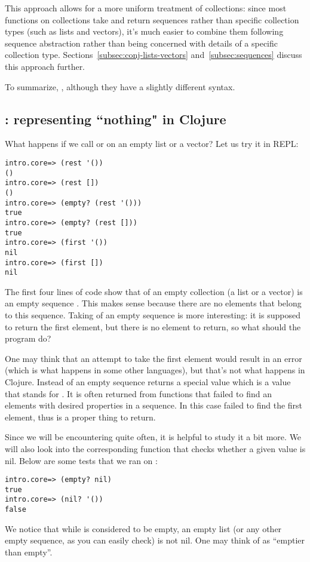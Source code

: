 This approach allows for a more uniform treatment of collections: since most functions on collections take and return sequences rather than specific collection types (such as lists and vectors), it's much easier to combine them following sequence abstraction rather than being concerned with details of a specific collection type. Sections~\ref{subsec:conj-lists-vectors} and~\ref{subsec:sequences} discuss this approach further. 

To summarize, , although they have a slightly different syntax.  


\subsection{: representing ``nothing" in Clojure}\label{subsec:nil}
What happens if we call  or  on an empty list or a vector?  Let us try it in REPL:
\begin{framed}
\begin{verbatim}
intro.core=> (rest '())
()
intro.core=> (rest [])
()
intro.core=> (empty? (rest '()))
true
intro.core=> (empty? (rest []))
true
intro.core=> (first '())
nil
intro.core=> (first [])
nil
\end{verbatim}
\end{framed}
The first four lines of code show that  of an empty collection (a list or a vector) is an empty sequence \clocode{()}. This makes sense because there are no elements that belong to this sequence. Taking  of an empty sequence is more interesting: it is supposed to return the first element, but there is no element to return, so what should the program do? 

One may think that an attempt to take the first element would result in an error (which is what happens in some other languages), but that's not what happens in Clojure. Instead  of an empty sequence returns a special value  which is a value that stands for . It is often returned from functions that failed to find an elements with desired properties in a sequence. In this case  failed to find the first element, thus  is a proper thing to return. 

Since we will be encountering  quite often, it is helpful to study it a bit more. We will also look into the corresponding function  that checks whether a given value is nil. Below are some tests that we ran on  :
\begin{framed}
\begin{verbatim}
intro.core=> (empty? nil)
true
intro.core=> (nil? '())
false
\end{verbatim}
\end{framed}
We notice that while  is considered to be empty, an empty list (or any other empty sequence, as you can easily check) is not nil. One may think of   as ``emptier than empty''. 


